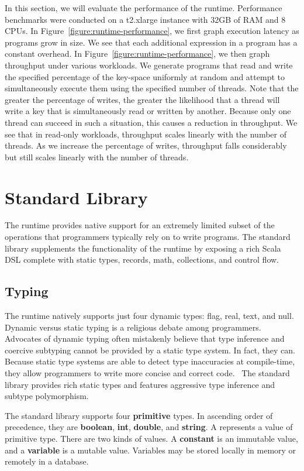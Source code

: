 \documentclass[../main.tex]{subfiles}
\begin{document}
  In this section, we will evaluate the performance of the runtime. Performance benchmarks were
  conducted on a t2.xlarge instance with 32GB of RAM and 8 CPUs. In
  Figure~\ref{figure:runtime-performance}, we first graph execution latency as programs grow in
  size. We see that each additional expression in a program has a constant overhead. In
  Figure~\ref{figure:runtime-performance}, we then graph throughput under various workloads. We
  generate programs that read and write the specified percentage of the key-space uniformly at
  random and attempt to simultaneously execute them using the specified number of threads. Note that
  the greater the percentage of writes, the greater the likelihood that a thread will write a key
  that is simultaneously read or written by another. Because only one thread can succeed in such a
  situation, this causes a reduction in throughput. We see that in read-only workloads, throughput
  scales linearly with the number of threads. As we increase the percentage of writes, throughput
  falls considerably but still scales linearly with the number of threads.

\section{Standard Library}
The runtime provides native support for an extremely limited subset of the operations that
programmers typically rely on to write programs. The standard library supplements the
functionality of the runtime by exposing a rich Scala DSL complete with static types, records,
math, collections, and control flow.

  \subsection{Typing}
  The runtime natively supports just four dynamic types: flag, real, text, and null.
  Dynamic versus static typing is a religious debate among programmers. Advocates of dynamic
  typing often mistakenly believe that type inference and coercive subtyping cannot be provided by
  a static type system. In fact, they can. Because static type systems are able to
  detect type inaccuracies at compile-time, they allow programmers to write more concise and
  correct code.~\cite{typing} The standard library provides rich static types and features
  aggressive type inference and subtype polymorphism.

  The standard library supports four \textbf{primitive} types. In ascending order of precedence,
  they are \textbf{boolean}, \textbf{int}, \textbf{double}, and \textbf{string}. A 
  represents a value of primitive type. There are two kinds of values. A \textbf{constant} is an
  immutable value, and a \textbf{variable} is a mutable value. Variables may be stored locally in
  memory or remotely in a database.
\end{document}
